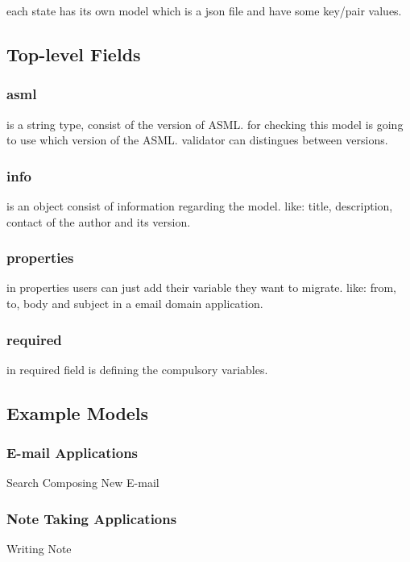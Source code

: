 each state has its own model which is a json file and have some key/pair values.

\subsection{Top-level Fields}
\subsubsection{asml}
is a string type, consist of the version of ASML. for checking this model is going to use which version of the ASML.
validator can distingues between versions. 

\subsubsection{info}
is an object consist of information regarding the model. like: title, description, contact of the author and its version.

\subsubsection{properties}
in properties users can just add their variable they want to migrate. like: from, to, body and subject in a email domain application.

\subsubsection{required}
in required field is defining the compulsory variables.

\subsection{Example Models}
\subsubsection{E-mail Applications}
Search
Composing New E-mail

\subsubsection{Note Taking Applications}
Writing Note
